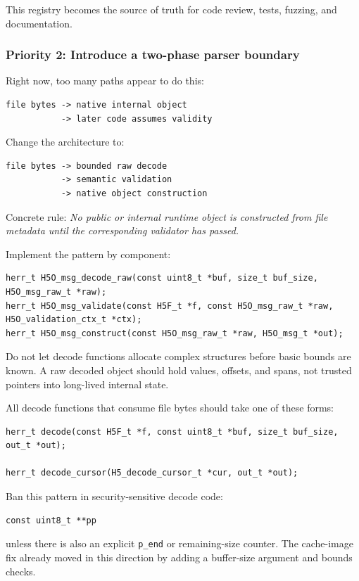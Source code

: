 \documentclass[../main.tex]{subfiles}
\begin{document}
This registry becomes the source of truth for code review, tests, fuzzing, and documentation.

\subsubsection*{Priority 2: Introduce a two-phase parser boundary}

Right now, too many paths appear to do this:
\begin{verbatim}
file bytes -> native internal object
           -> later code assumes validity
\end{verbatim}

Change the architecture to:
\begin{verbatim}
file bytes -> bounded raw decode
           -> semantic validation
           -> native object construction
\end{verbatim}

Concrete rule: \textit{No public or internal runtime object is constructed from
file metadata until the corresponding validator has passed.}

Implement the pattern by component:

\begin{verbatim}
herr_t H5O_msg_decode_raw(const uint8_t *buf, size_t buf_size, H5O_msg_raw_t *raw);
herr_t H5O_msg_validate(const H5F_t *f, const H5O_msg_raw_t *raw, H5O_validation_ctx_t *ctx);
herr_t H5O_msg_construct(const H5O_msg_raw_t *raw, H5O_msg_t *out);    
\end{verbatim}

Do not let decode functions allocate complex structures before basic
bounds are known. A raw decoded object should hold values, offsets,
and spans, not trusted pointers into long-lived internal state.

All decode functions that consume file bytes should take one of these forms:
\begin{verbatim}
herr_t decode(const H5F_t *f, const uint8_t *buf, size_t buf_size, out_t *out);

herr_t decode_cursor(H5_decode_cursor_t *cur, out_t *out);
\end{verbatim}

Ban this pattern in security-sensitive decode code:
\begin{verbatim}
const uint8_t **pp
\end{verbatim}
unless there is also an explicit \texttt{p\_end} or remaining-size counter. The cache-image fix already moved in this direction
by adding a buffer-size argument and bounds checks.~\cite{commit_3914bb7}
\end{document}
